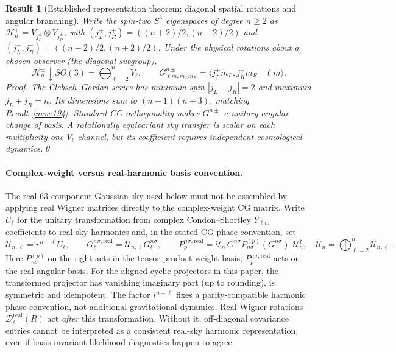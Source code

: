 \documentclass[aps,prd,onecolumn,notitlepage,groupedaddress,11pt]{revtex4-2}
\newtheorem{result}{Result}
\begin{document}
\begin{result}[\textsf{Established representation theorem}: diagonal spatial rotations and angular branching]\label{new:207}
Write the spin-two $S^3$ eigenspaces of degree $n\ge2$ as $\mathcal H_n^\pm =V_{j_L^\pm}\otimes V_{j_R^\pm}$, with
$(j_L^+,j_R^+)=((n+2)/2,(n-2)/2)$ and $(j_L^-,j_R^-)=((n-2)/2,(n+2)/2)$. Under the physical rotations about a chosen observer (the diagonal subgroup),
\begin{equation}\label{eq:cgspin2}
\mathcal H_n^\pm\downarrow SO(3)=\bigoplus_{\ell=2}^{n}V_\ell,\qquad
G^{n\pm}_{\ell m,m_Lm_R}=\langle j_L^\pm m_L,j_R^\pm m_R\mid \ell m\rangle.
\end{equation}
\textit{Proof.} The Clebsch--Gordan series has minimum spin $|j_L-j_R|=2$ and maximum $j_L+j_R=n$. Its dimensions sum to $(n-1)(n+3)$, matching Result~\ref{new:194}. Standard CG orthogonality makes $G^{n\pm}$ a unitary angular change of basis. A rotationally equivariant sky transfer is scalar on each multiplicity-one $V_\ell$ channel, but its coefficient requires independent cosmological dynamics.\qed
\end{result}

\paragraph{Complex-weight versus real-harmonic basis convention.}
The real $63$-component Gaussian sky used below must not be assembled by
applying real Wigner matrices directly to the complex-weight CG matrix.
Write $U_\ell$ for the unitary transformation from complex Condon--Shortley
$Y_{\ell m}$ coefficients to real sky harmonics and, in the stated CG
phase convention, set
\begin{equation}\label{eq:real-cg-frame}
 \mathcal U_{n,\ell}=i^{\,n-\ell}U_\ell,\qquad
 G^{n\sigma,\mathrm{real}}_{\ell}=\mathcal U_{n,\ell}G^{n\sigma}_{\ell},\qquad
 P^{n\sigma,\mathrm{real}}_p=\mathcal U_n\,G^{n\sigma}
 P_{n\sigma}^{(p)}(G^{n\sigma})^\dagger\mathcal U_n^\dagger,
 \quad\mathcal U_n=\bigoplus_{\ell=2}^n\mathcal U_{n,\ell}.
\end{equation}
Here $P_{n\sigma}^{(p)}$ on the right acts in the tensor-product weight
basis; $P^{n\sigma,\mathrm{real}}_p$ acts on the real angular basis.
For the aligned cyclic projectors in this paper, the transformed projector
has vanishing imaginary part (up to rounding), is symmetric and idempotent.
The factor $i^{n-\ell}$ fixes a parity-compatible harmonic phase convention,
not additional gravitational dynamics. Real Wigner rotations
$\mathcal D_\ell^{\mathrm{real}}(R)$ act \emph{after} this transformation.
Without it, off-diagonal covariance entries cannot be interpreted as a
consistent real-sky harmonic representation, even if basis-invariant
likelihood diagnostics happen to agree.
\end{document}
